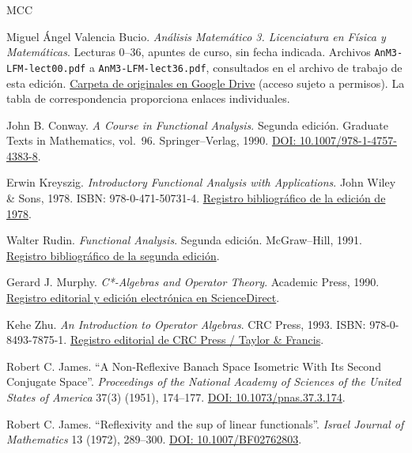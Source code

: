 \begin{thebibliography}{MCC}
Miguel Ángel Valencia Bucio. \emph{Análisis Matemático 3. Licenciatura en Física y Matemáticas}. Lecturas 0--36, apuntes de curso, sin fecha indicada. Archivos \texttt{AnM3-LFM-lect00.pdf} a \texttt{AnM3-LFM-lect36.pdf}, consultados en el archivo de trabajo de esta edición.
\href{https://drive.google.com/drive/folders/1KXeUZ0ax5PE6BhLl8LuRzQxS5M5Tx8pF}{Carpeta de originales en Google Drive} (acceso sujeto a permisos). La tabla de correspondencia proporciona enlaces individuales.

John B. Conway. \emph{A Course in Functional Analysis}. Segunda edición. Graduate Texts in Mathematics, vol.~96. Springer--Verlag, 1990.
\href{https://doi.org/10.1007/978-1-4757-4383-8}{DOI: 10.1007/978-1-4757-4383-8}.

Erwin Kreyszig. \emph{Introductory Functional Analysis with Applications}. John Wiley \& Sons, 1978. ISBN: 978-0-471-50731-4.
\href{https://books.google.com/books/about/Introductory_Functional_Analysis_with_Ap.html?id=Va8rAAAAYAAJ}{Registro bibliográfico de la edición de 1978}.

Walter Rudin. \emph{Functional Analysis}. Segunda edición. McGraw--Hill, 1991.
\href{https://books.google.com/books/about/Functional_Analysis.html?id=IH2uAAAACAAJ}{Registro bibliográfico de la segunda edición}.

Gerard J. Murphy. \emph{C*-Algebras and Operator Theory}. Academic Press, 1990.
\href{https://www.sciencedirect.com/book/monograph/9780080924960/c-algebras-and-operator-theory}{Registro editorial y edición electrónica en ScienceDirect}.

Kehe Zhu. \emph{An Introduction to Operator Algebras}. CRC Press, 1993. ISBN: 978-0-8493-7875-1.
\href{https://www.routledge.com/An-Introduction-to-Operator-Algebras-1st-Edition/Zhu-Krantz/p/book/9781315137292}{Registro editorial de CRC Press / Taylor \& Francis}.

Robert C. James. ``A Non-Reflexive Banach Space Isometric With Its Second Conjugate Space''. \emph{Proceedings of the National Academy of Sciences of the United States of America} 37(3) (1951), 174--177.
\href{https://doi.org/10.1073/pnas.37.3.174}{DOI: 10.1073/pnas.37.3.174}.

Robert C. James. ``Reflexivity and the sup of linear functionals''. \emph{Israel Journal of Mathematics} 13 (1972), 289--300.
\href{https://doi.org/10.1007/BF02762803}{DOI: 10.1007/BF02762803}.


\end{thebibliography}
